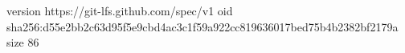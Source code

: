 version https://git-lfs.github.com/spec/v1
oid sha256:d55e2bb2c63d95f5e9cbd4ac3c1f59a922cc819636017bed75b4b2382bf2179a
size 86
